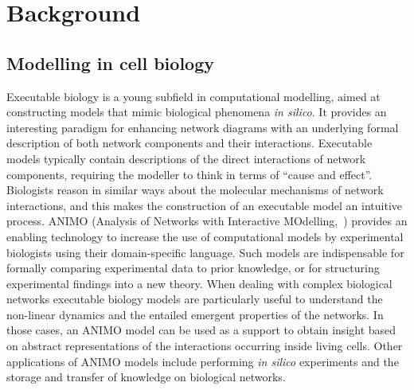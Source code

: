 \documentclass{bmcart}
\begin{document}
\section*{Background}\label{sec:introduction}
\subsection*{Modelling in cell biology}
Executable biology is a young subfield in computational modelling, aimed at constructing models that mimic
biological phenomena \emph{in silico}. It provides an interesting paradigm for enhancing network
diagrams with an underlying formal description of both network components and their interactions.
Executable models typically contain descriptions of the direct interactions of network components,
requiring the modeller to think in terms of
``cause and effect''. Biologists reason in similar ways about the molecular mechanisms of network
interactions, and this makes the construction of an executable model an intuitive process.
ANIMO (Analysis of Networks with Interactive MOdelling,~\cite{animo-ieee,animo-gene})
provides an enabling technology to increase the use of computational models by experimental
biologists using their domain-specific language. Such models are indispensable for formally
comparing experimental data to prior knowledge, or for structuring experimental findings into a
new theory.
When dealing with complex biological networks executable biology models are particularly useful
to understand the non-linear dynamics and the entailed emergent properties of the networks.
In those cases, an ANIMO model can be used as a support to obtain insight based on abstract
representations of the interactions occurring inside living cells.
Other applications of ANIMO models include performing \emph{in silico} experiments and
the storage and transfer of knowledge on biological networks.
\end{document}

